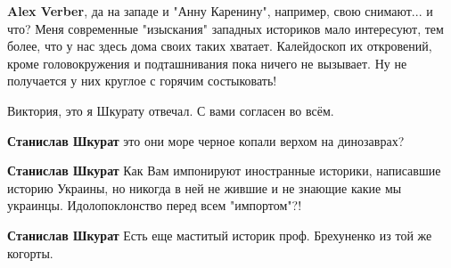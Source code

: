 \begin{itemize}
\begin{itemize}
 
\textbf{Alex Verber}, да на западе и "Анну Каренину", например, свою снимают... и что? Меня современные "изыскания" западных историков мало интересуют, тем более, что у нас здесь дома своих таких хватает. Калейдоскоп их откровений, кроме головокружения и подташнивания пока ничего не вызывает. Ну не получается у них круглое с горячим состыковать!

 
Виктория, это я Шкурату отвечал. С вами согласен во всём.

 
\textbf{Станислав Шкурат} это они море черное копали верхом на динозаврах?

 
\textbf{Станислав Шкурат}
Как Вам импонируют иностранные историки, написавшие историю Украины, но никогда в ней не жившие и не знающие какие мы украинцы. Идолопоклонство перед всем "импортом"?!

 
\textbf{Станислав Шкурат} Есть еще маститый историк проф. Брехуненко из той же когорты.

 

\end{itemize}
\end{itemize}
